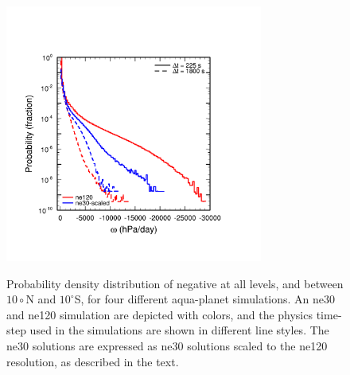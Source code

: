 \begin{figure}[t]
\begin{center}
\noindent\includegraphics[width=20pc,angle=0]{chapter3/Figure10_crop.pdf}\\
\end{center}
\caption{Probability density distribution of negative  at all levels, and between $10{\circ}$N and $10^{\circ}$S, for four different aqua-planet simulations. An ne30 and ne120 simulation are depicted with colors, and the physics time-step used in the simulations are shown in different line styles. The ne30 solutions are expressed as ne30 solutions scaled to the ne120 resolution, as described in the text.}
\label{fig:figure3-10}
\end{figure}

